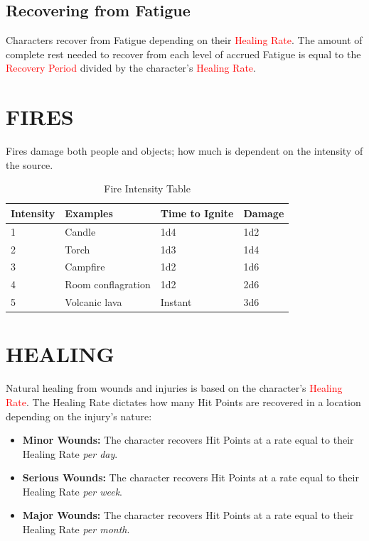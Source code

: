 \documentclass[10pt]{article}
\begin{document}
\subsection{Recovering from Fatigue}
Characters recover from Fatigue depending on their \textcolor{red}{Healing Rate}. The amount of complete rest needed to recover from each level of accrued Fatigue is equal to the \textcolor{red}{Recovery Period} divided by the character's \textcolor{red}{Healing Rate}.

\section{FIRES}
\label{sec:fires}
Fires damage both people and objects; how much is dependent on the intensity of the source.

\begin{table}[h]
\centering
\caption{Fire Intensity Table}
\label{tab:fire}
\begin{tabular}{llll}
\toprule
\textbf{Intensity} & \textbf{Examples} & \textbf{Time to Ignite} & \textbf{Damage} \\
\midrule
1 & Candle & 1d4 & 1d2 \\
2 & Torch & 1d3 & 1d4 \\
3 & Campfire & 1d2 & 1d6 \\
4 & Room conflagration & 1d2 & 2d6 \\
5 & Volcanic lava & Instant & 3d6 \\
\bottomrule
\end{tabular}
\end{table}

\section{HEALING}
\label{sec:healing}
Natural healing from wounds and injuries is based on the character's \textcolor{red}{Healing Rate}. The Healing Rate dictates how many Hit Points are recovered in a location depending on the injury's nature:

\begin{itemize}[leftmargin=*]
    \item \textbf{Minor Wounds:} The character recovers Hit Points at a rate equal to their Healing Rate \textit{per day}.
    \item \textbf{Serious Wounds:} The character recovers Hit Points at a rate equal to their Healing Rate \textit{per week}.
    \item \textbf{Major Wounds:} The character recovers Hit Points at a rate equal to their Healing Rate \textit{per month}.
\end{itemize}
\end{document}

